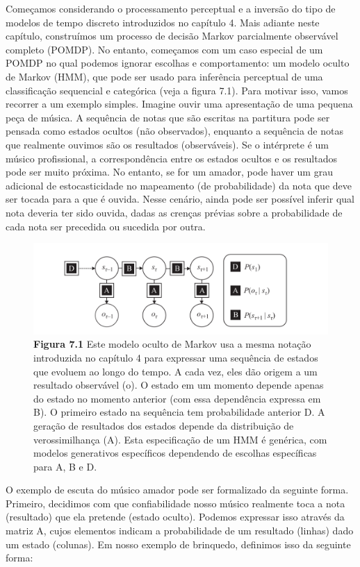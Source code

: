 \documentclass[
  12pt,
]{book}
\begin{document}
Começamos considerando o processamento perceptual e a inversão do tipo de modelos de tempo discreto introduzidos no capítulo 4. Mais adiante neste capítulo, construímos um processo de decisão Markov parcialmente observável completo (POMDP). No entanto, começamos com um caso especial de um POMDP no qual podemos ignorar escolhas e comportamento: um modelo oculto de Markov (HMM), que pode ser usado para inferência perceptual de uma classificação sequencial e categórica (veja a figura 7.1). Para motivar isso, vamos recorrer a um exemplo simples. Imagine ouvir uma apresentação de uma pequena peça de música. A sequência de notas que são escritas na partitura pode ser pensada como estados ocultos (não observados), enquanto a sequência de notas que realmente ouvimos são os resultados (observáveis). Se o intérprete é um músico profissional, a correspondência entre os estados ocultos e os resultados pode ser muito próxima. No entanto, se for um amador, pode haver um grau adicional de estocasticidade no mapeamento (de probabilidade) da nota que deve ser tocada para a que é ouvida. Nesse cenário, ainda pode ser possível inferir qual nota deveria ter sido ouvida, dadas as crenças prévias sobre a probabilidade de cada nota ser precedida ou sucedida por outra.

\begin{figure}
\centering
\includegraphics{images/Figura_7_1.png}
\caption{\textbf{Figura 7.1} Este modelo oculto de Markov usa a mesma notação introduzida no capítulo 4 para expressar uma sequência de estados que evoluem ao longo do tempo. A cada vez, eles dão origem a um resultado observável (o). O estado em um momento depende apenas do estado no momento anterior (com essa dependência expressa em B). O primeiro estado na sequência tem probabilidade anterior D. A geração de resultados dos estados depende da distribuição de verossimilhança (A). Esta especificação de um HMM é genérica, com modelos generativos específicos dependendo de escolhas específicas para A, B e D.}
\end{figure}

O exemplo de escuta do músico amador pode ser formalizado da seguinte forma. Primeiro, decidimos com que confiabilidade nosso músico realmente toca a nota (resultado) que ela pretende (estado oculto). Podemos expressar isso através da matriz A, cujos elementos indicam a probabilidade de um resultado (linhas) dado um estado (colunas). Em nosso exemplo de brinquedo, definimos isso da seguinte forma:
\end{document}
